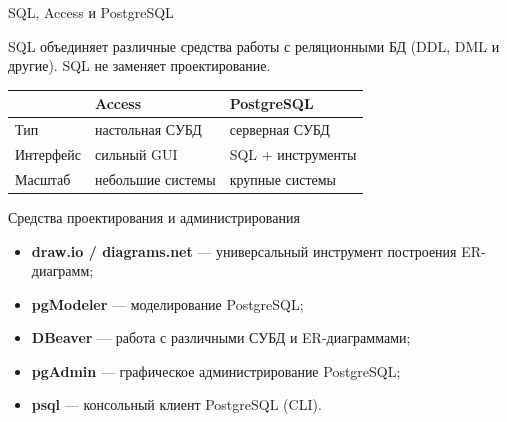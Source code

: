\documentclass[aspectratio=169]{beamer}
\begin{document}
\begin{frame}{SQL, Access и PostgreSQL}

SQL объединяет различные средства работы
с реляционными БД (DDL, DML и другие).
SQL не заменяет проектирование.

\vspace{0.3cm}
\small
\begin{table}
\centering
\begin{tabular}{p{}|p{}|p{}}
\toprule
 & \textbf{Access} & \textbf{PostgreSQL}\\
\midrule
Тип & настольная СУБД & серверная СУБД\\
Интерфейс & сильный GUI & SQL + инструменты\\
Масштаб & небольшие системы & крупные системы\\
\bottomrule
\end{tabular}
\end{table}

\normalsize

\end{frame}


\begin{frame}{Средства проектирования и администрирования}

\begin{itemize}
  \item \textbf{draw.io / diagrams.net} — универсальный
        инструмент построения ER-диаграмм;
  \item \textbf{pgModeler} — моделирование PostgreSQL;
  \item \textbf{DBeaver} — работа с различными СУБД
        и ER-диаграммами;
  \item \textbf{pgAdmin} — графическое администрирование PostgreSQL;
  \item \textbf{psql} — консольный клиент PostgreSQL (CLI).
\end{itemize}

\end{frame}



\end{document}
